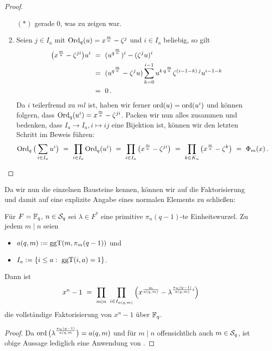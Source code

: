 \begin{proof}
\begin{enumerate}
    $(\ast)$ gerade $0$, was zu zeigen war.
  \item Seien $j\in I_a$ mit $\Ord_q(u) = x^\frac m a - \zeta^j$ und 
    $i\in I_a$ beliebig, so gilt
    \begin{align*}
      \big( x^\frac m a - \zeta^{ji} \big) u^i \speq{&=}
      (u^{q^\frac m a})^i - (\zeta^ju)^i \\
      \speq{&=} (u^{q^\frac m a} - \zeta^ju) 
        \sum_{k=0}^{i-1} u^{k\,q^\frac m a} \zeta^{(i-1-k)\,j}u^{i-1-k} \\
        \speq{&=} 0\,.
    \end{align*}
    Da $i$ teilerfremd zu $ml$ ist, haben wir ferner $\ord(u) = \ord(u^i)$ und
    können folgern, dass $\Ord_q(u^i) = x^\frac m a - \zeta^{ji}$.
    Packen wir nun alles zusammen und bedenken, dass
    $I_a \to I_a, i\mapsto ij$ eine Bijektion ist, können wir den letzten
    Schritt im Beweis führen:
    \[ \Ord_q\big( \sum_{i\in I_a} u^i \big)
      \speq= \prod_{i\in I_a} \Ord_q(u^i) \speq=
      \prod_{i \in I_a} \big( x^\frac m a - \zeta^{ji} \big)
      \speq= \prod_{k\in K_a} \big(x^\frac m a - \zeta^k \big)
      \speq= \Phi_m(x)\,.\]
  \end{enumerate}
\end{proof}

Da wir nun die einzelnen Bausteine kennen, können wir auf die Faktorisierung
und damit auf eine explizite Angabe eines normalen Elements zu schließen:

\begin{kor}
  \label{kor:konstruktion-q-ordnung}
  Für $F = \F_q$, $n\in \S_q$ sei $\lambda \in F^\ast$ eine primitive 
  $\pi_n(q-1)$-te Einheitswurzel. Zu jedem $m \mid n$ seien
  \begin{itemize}
    \item $a(q,m) := \ggT(m,\pi_m(q-1))$ und
    \item $I_a := \{ i\leq a:\ \ggT(i,a) = 1\}$.
  \end{itemize}
  Dann ist
  \[ x^n-1 \speq= \prod_{m\mid n}\ \prod_{i\in I_{a(q,m)}} 
    \left( x^\frac{m}{a(q,m)} - \lambda^{\frac{\pi_n(q-1)}{a(q,m)} i}\right)\]
  die vollständige Faktorisierung von $x^n-1$ über $\F_q$.
\end{kor}
\begin{proof}
  Da  $\ord\big(\lambda^{\frac{\pi_n(q-1)}{a(q,m}}\big) = a(q,m)$
  und für $m\mid n$ offensichtlich auch $m\in \S_q$, ist obige Aussage lediglich
  eine Anwendung von .
\end{proof}


